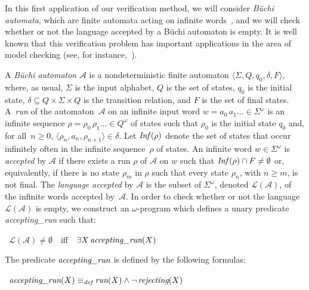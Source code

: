 \documentclass[english]{tlp}
\newcommand{\Mathit}[1]{\mbox{\it #1}}
\begin{document}
\vspace*{-2mm}

\begin{example}
\label{ex:buechi}

In this first application of our verification method,
we will consider {\em B\"{u}chi automata},
which are finite automata acting on infinite words~\cite{Tho90}, 
and we will check whether or not the language 
accepted by a {B\"{u}chi automaton} is empty. 
It is
well known that this verification problem has important applications
in the area of model checking (see, for instance,~\cite{Cl&99}).

A {\em B\"{u}chi automaton} $\mathcal A$ is a nondeterministic finite automaton
 $\langle\Sigma,Q,q_0, \delta,F\rangle$, where, as usual, $\Sigma$ is the input
alphabet, $Q$ is the set of states, $q_0$ is the initial state,
$\delta\subseteq Q\!\times\!\Sigma\!\times\! Q$ is the transition
relation, and $F$ is the set of final states. A~{\em run} of the
automaton~$\mathcal A$ on an infinite input word
$w\!=\!a_0\,a_1\ldots\in\Sigma^\omega$ is an infinite sequence
$\rho\!=\!\rho_0\,\rho_1\ldots\in Q^\omega$ of states such that $\rho_0$
is the initial state $q_0$ and, for all~$n\!\geq\! 0$, $\langle
\rho_n,a_n,\rho_{n+1}\rangle \in \delta$. Let $\mbox{\it{Inf}}\,(\rho)$
denote the set of states that occur infinitely often in the
infinite sequence~$\rho$ of states. An infinite word
$w\in\Sigma^\omega$ is {\em accepted} by $\mathcal A$ if there
exists a run $\rho$ of $\mathcal A$ on $w$ such that
$\mbox{\it{Inf}}\,(\rho)\cap F\neq\emptyset$ or, equivalently, if there is
no state $\rho_m$ in $\rho$ such that every  state $\rho_n$,
with $n\geq m$, is not final. The {\em language accepted} by $\mathcal A$
is the subset of $\Sigma^{\omega}$, denoted $\mathcal L(\mathcal A)$, of the
infinite words accepted by~$\mathcal A$.
In order to check whether or not the language $\mathcal L(\mathcal A)$ is
empty, we construct an $\omega$-program which defines a unary predicate 
{\it{accepting\_run}} such that:

\smallskip
\noindent\makebox[5mm][l]{$(\alpha)$}~$\mathcal L(\mathcal
A)\neq\emptyset$~~iff~~$\exists
X\,\mbox{\it{accepting\_run}}(X)$

\smallskip
\noindent The predicate $\mbox{\it{accepting\_run}}$ is defined by the
following formulas:

\smallskip
\noindent{}~$\mbox{\it{accepting\_run}}(X)
\equiv_{\scriptsize{\Mathit{def}}}\Mathit{run}(X)\wedge \neg\,\mbox{\Mathit{rejecting}}(X)$


\end{example}
\end{document}
